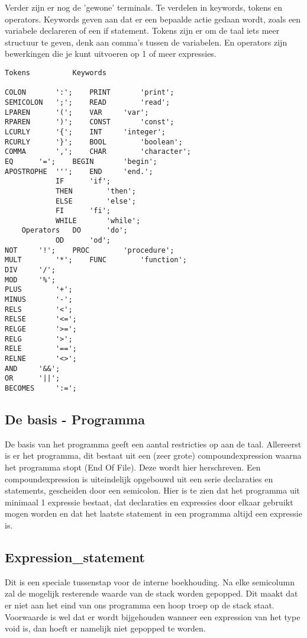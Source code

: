 \documentclass[]{article}
\begin{document}
Verder zijn er nog de 'gewone' terminals. Te verdelen in keywords, tokens en operators. Keywords geven aan dat er een bepaalde actie gedaan wordt, zoals een variabele declareren of een if statement. Tokens zijn er om de taal iets meer structuur te geven, denk aan comma's tussen de variabelen. En operators zijn bewerkingen die je kunt uitvoeren op 1 of meer expressies.
\\
\begin{lstlisting}[style=ANTLR]
	Tokens			Keywords
	
COLON		':';	PRINT		'print';
SEMICOLON	';';	READ		'read';
LPAREN		'(';	VAR		'var';
RPAREN		')';	CONST		'const';
LCURLY		'{';	INT		'integer';
RCURLY		'}';	BOOL		'boolean';
COMMA		',';	CHAR		'character';
EQ		'=';	BEGIN		'begin';
APOSTROPHE	''';	END		'end.';
			IF		'if';
			THEN		'then';
			ELSE		'else';
			FI		'fi';
			WHILE		'while';
	Operators	DO		'do';
			OD		'od';
NOT		'!';	PROC		'procedure';
MULT		'*';	FUNC		'function';
DIV		'/';
MOD		'%';
PLUS		'+';
MINUS		'-';
RELS		'<';
RELSE		'<=';
RELGE		'>=';
RELG		'>';
RELE		'==';
RELNE		'<>';
AND		'&&';
OR		'||';
BECOMES		':=';
\end{lstlisting}
\newpage

\subsection{De basis - Programma}
De basis van het programma geeft een aantal restricties op aan de taal.
Allereerst is er het programma, dit bestaat uit een (zeer grote) compoundexpression waarna het programma stopt (End Of File). Deze wordt hier herschreven. Een compoundexpression is uiteindelijk opgebouwd uit een serie declaraties en statements, gescheiden door een semicolon. Hier is te zien dat het programma uit minimaal 1 expressie bestaat, dat declaraties en expressies door elkaar gebruikt mogen worden en dat het laatste statement in een programma altijd een expressie is.


\subsection{Expression\_statement}
Dit is een speciale tussenstap voor de interne boekhouding. Na elke semicolumn zal de mogelijk resterende waarde van de stack worden gepopped. Dit maakt dat er niet aan het eind van ons programma een hoop troep op de stack staat. Voorwaarde is wel dat er wordt bijgehouden wanneer een expression van het type void is, dan hoeft er namelijk niet gepopped te worden.

\end{document}
